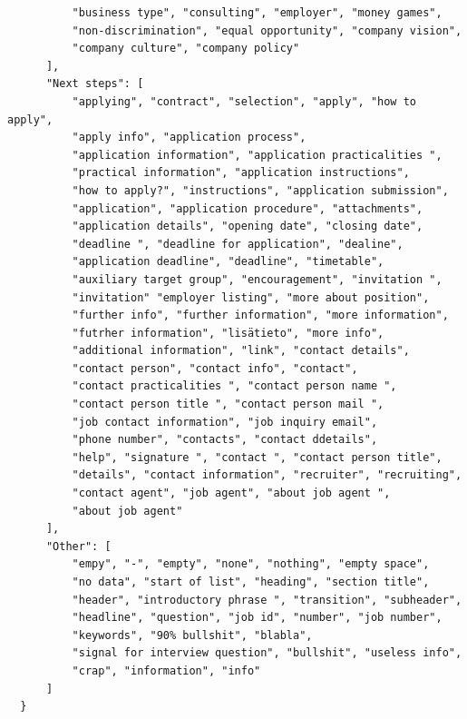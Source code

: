 \begin{verbatim}
          "business type", "consulting", "employer", "money games",
          "non-discrimination", "equal opportunity", "company vision",
          "company culture", "company policy"
      ],
      "Next steps": [
          "applying", "contract", "selection", "apply", "how to apply",
          "apply info", "application process",
          "application information", "application practicalities ",
          "practical information", "application instructions",
          "how to apply?", "instructions", "application submission",
          "application", "application procedure", "attachments",
          "application details", "opening date", "closing date",
          "deadline ", "deadline for application", "dealine",
          "application deadline", "deadline", "timetable",
          "auxiliary target group", "encouragement", "invitation ",
          "invitation" "employer listing", "more about position",
          "further info", "further information", "more information",
          "futrher information", "lisätieto", "more info",
          "additional information", "link", "contact details",
          "contact person", "contact info", "contact",
          "contact practicalities ", "contact person name ",
          "contact person title ", "contact person mail ",
          "job contact information", "job inquiry email",
          "phone number", "contacts", "contact ddetails",
          "help", "signature ", "contact ", "contact person title",
          "details", "contact information", "recruiter", "recruiting",
          "contact agent", "job agent", "about job agent ",
          "about job agent"
      ],
      "Other": [
          "empy", "-", "empty", "none", "nothing", "empty space",
          "no data", "start of list", "heading", "section title",
          "header", "introductory phrase ", "transition", "subheader",
          "headline", "question", "job id", "number", "job number",
          "keywords", "90% bullshit", "blabla",
          "signal for interview question", "bullshit", "useless info",
          "crap", "information", "info"
      ]
  }
\end{verbatim}


